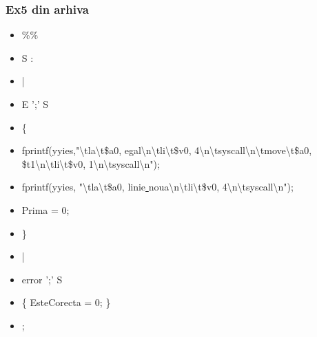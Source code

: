 \documentclass[pdf]{beamer}
\begin{document}
\begin{frame}
\frametitle{Ex5 din arhiva}
\begin{itemize}
\item
\%\%
\item
S : 
\item \quad
    |
\item \quad
    E ';' S 
\item \qquad
	\{ 
\item \qquad \hspace{4mm}
		fprintf(yyies,"\textbackslash{t}la\textbackslash{t}\$a0, egal\textbackslash{n}\textbackslash{t}li\textbackslash{t}\$v0, 4\textbackslash{n}\textbackslash{t}syscall\textbackslash{n}\textbackslash{t}move\textbackslash{t}\$a0, \$t1\textbackslash{n}\textbackslash{t}li\textbackslash{t}\$v0, 1\textbackslash{n}\textbackslash{t}syscall\textbackslash{n}");
\item \qquad \hspace{4mm}
		fprintf(yyies, "\textbackslash{t}la\textbackslash{t}\$a0, linie\underline{ }noua\textbackslash{n}\textbackslash{t}li\textbackslash{t}\$v0, 4\textbackslash{n}\textbackslash{t}syscall\textbackslash{n}"); 
\item \qquad \hspace{4mm}
		Prima = 0;
\item \qquad
	\}
\item \quad
    | 
\item \quad
    error ';' S
\item \qquad
       \{ EsteCorecta = 0; \}
\item \quad
    ;
\end{itemize}
\end{frame}
\end{document}
